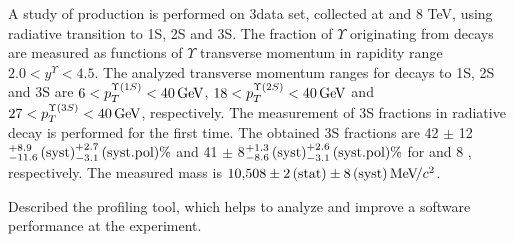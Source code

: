 A study of \chib production is performed on 3\invfb data set, collected
at  and 8 TeV, using \chib radiative transition to
\Y1S, \Y2S and \Y3S. The fraction of $\Upsilon$ originating from \chib decays
are measured as functions of $\Upsilon$ transverse momentum in rapidity range
$2.0 < y^{\Upsilon} < 4.5$. The analyzed transverse momentum ranges for decays
to \Y1S, \Y2S and \Y3S are $6<p_T^{\Y1S}<40\gev$, $18<p_T^{\Y2S}<40\gev$ and
$27<p_T^{\Y3S}<40\gev$, respectively. The measurement of
\Y3S fractions in radiative \chibThreeP decay is performed for the first time.
The obtained \Y3S fractions are 42 $\pm$ 12\stat${}^{+8.9}_{-11.6}\mathrm{\,(syst)}^{+2.7}_{-3.1}\mathrm{\,(syst.pol)} \%$ and 41 $\pm$ 8\stat${}^{+1.3}_{-8.6}\mathrm{\,(syst)}^{+2.6}_{-3.1}\mathrm{\,(syst.pol)} \%$ for  and 8 \tev,
respectively. The measured \chiboneThreeP mass is $10{,}508 \pm 2\mathrm{\,(stat)} \pm
8\mathrm{\,(syst)} {\mathrm{\,Me\kern -0.1em V\!/}c^2}$.

Described the profiling tool, which helps to analyze and improve a software
performance at the \lhcb experiment.

